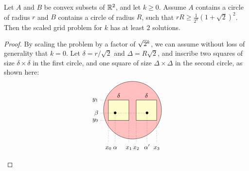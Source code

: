\documentclass{article}
\begin{document}
\begin{lemma}\label{lem-2-solutions}
  Let $A$ and $B$ be convex subsets of ${\mathbb{R}}^2$, and let $k\geq 0$.
  Assume $A$ contains a circle of radius $r$ and $B$ contains a circle
  of radius $R$, such that $rR\geq \frac{1}{2^k}(1+\sqrt2)^2$. Then
  the scaled grid problem for $k$ has at least $2$ solutions.
\end{lemma}

\begin{proof}
  By scaling the problem by a factor of $\sqrt{2}{}^{k}$, we can assume
  without loss of generality that $k=0$. Let $\delta={r}/{\sqrt2}$
  and $\Delta=R\sqrt2$, and inscribe two squares of size
  $\delta\times\delta$ in the first circle, and one square of size
  $\Delta\times\Delta$ in the second circle, as shown here:
  \[ \begin{tikzpicture}[scale=1.5] 
    \draw[fill=red!25] (0,0) circle (1);
    \draw[shift={(0.48,0)}, scale=0.5] (0,.707) node[above] {\small $\delta$};
    \draw[shift={(0.48,0)}, scale=0.5, fill=yellow!20] (-.707,-.707) -- (.707,-.707) -- (.707,.707) -- (-.707,.707) -- cycle;
    \draw[shift={(-0.48,0)}, scale=0.5] (0,.707) node[above] {\small $\delta$};
    \draw[shift={(-0.48,0)}, scale=0.5, fill=yellow!20] (-.707,-.707) -- (.707,-.707) -- (.707,.707) -- (-.707,.707) -- cycle;
    \draw[shift={(-0.48,0)}, scale=0.5, dotted] (-.707,-2.7) node[above, anchor=base] {\small $x_0$} +(0, 0.5) -- (-.707,-.707);
    \draw[shift={(-0.48,0)}, scale=0.5, dotted] (.707,-2.7) node[above, anchor=base] {\small $x_1$} +(0, 0.5) -- (.707,-.707);
    \draw[shift={(0.48,0)}, scale=0.5, dotted] (-.707,-2.7) node[above, anchor=base] {\small $x_2$} +(0, 0.5) -- (-.707,-.707);
    \draw[shift={(0.48,0)}, scale=0.5, dotted] (.707,-2.7) node[above, anchor=base] {\small $x_3$} +(0, 0.5) -- (.707,-.707);
    \draw[dotted] (-0.6, -1.35) node[above, anchor=base] {\small $\alpha$} +(0, 0.25) -- (-0.6, -.1);
    \draw[dotted] (0.5, -1.35) node[above, anchor=base] {\small $\alpha'$} +(0, 0.25) -- (0.5, -.1);
    \draw[shift={(-0.45,0)}, scale=0.5, dotted] (-1.3,-.707) node[left] {\small $y_0$} -- (-.707,-.707);
    \draw[shift={(-0.45,0)}, scale=0.5, dotted] (-1.3,.707) node[left] {\small $y_1$} -- (-.707,.707);
    \draw[dotted] (-1.1, -.1) node[left] {\small $\beta$} -- (0.5, -.1);
    \def\dot#1{\draw (#1) node {$\bullet$};}
    \dot{-0.6, -.1} 
    \dot{0.5, -.1} 


\end{tikzpicture}\]
\end{proof}
\end{document}

